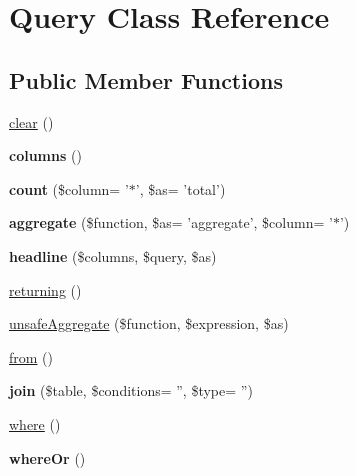 \hypertarget{classQuery}{
\section{Query Class Reference}
\label{classQuery}
}
\subsection*{Public Member Functions}
\begin{DoxyCompactItemize}
\item 
\hyperlink{classQuery_afcc3b8a0062df742a516c895ad05eadf}{clear} ()
\item 
\hypertarget{classQuery_ac5a3db6877b1d63b67def06e24bb86cb}{
{\bfseries columns} ()}
\label{classQuery_ac5a3db6877b1d63b67def06e24bb86cb}

\item 
\hypertarget{classQuery_a5e5d7b30a86a5b809137a57a62b684fa}{
{\bfseries count} (\$column= '$\ast$', \$as= 'total')}
\label{classQuery_a5e5d7b30a86a5b809137a57a62b684fa}

\item 
\hypertarget{classQuery_a9ec81787bd0d69ec85987a047915bcb9}{
{\bfseries aggregate} (\$function, \$as= 'aggregate', \$column= '$\ast$')}
\label{classQuery_a9ec81787bd0d69ec85987a047915bcb9}

\item 
\hypertarget{classQuery_ae158383677b601890431921bb035f51b}{
{\bfseries headline} (\$columns, \$query, \$as)}
\label{classQuery_ae158383677b601890431921bb035f51b}

\item 
\hyperlink{classQuery_af44f7bf797779dbbb930e60a53011c6b}{returning} ()
\item 
\hyperlink{classQuery_a92265762363eb9c0255d8167e8274697}{unsafeAggregate} (\$function, \$expression, \$as)
\item 
\hyperlink{classQuery_aaa091145c66718e59db922d065160863}{from} ()
\item 
\hypertarget{classQuery_ade76ff8694567ab372a4f450bb1bcd2e}{
{\bfseries join} (\$table, \$conditions= '', \$type= '')}
\label{classQuery_ade76ff8694567ab372a4f450bb1bcd2e}

\item 
\hyperlink{classQuery_ab1781adb9932c6280373e2abd698f9c8}{where} ()
\item 
\hypertarget{classQuery_a296b505b36d9bc21dfa1608471eabede}{
{\bfseries whereOr} ()}
\label{classQuery_a296b505b36d9bc21dfa1608471eabede}


\end{DoxyCompactItemize}
